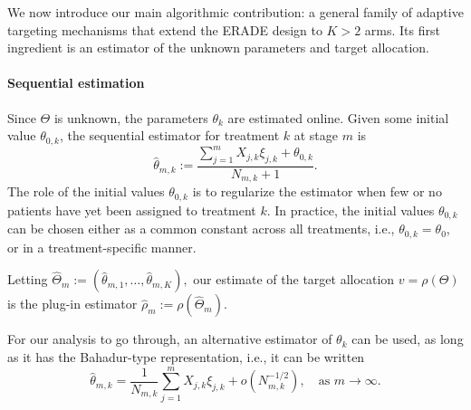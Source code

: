 We now introduce our main algorithmic contribution: a general family of adaptive targeting mechanisms that extend the ERADE design to $K> 2$ arms. Its first ingredient is an estimator of the unknown parameters and target allocation.

\paragraph*{Sequential estimation} 
Since $\Theta$ is unknown, the parameters $\theta_k$ are estimated online. Given some initial value $\theta_{0,k}$, the sequential estimator for treatment $k$ at stage $m$ is
\begin{equation}\label{eq:dbcd-estimator}
	\hat{\theta}_{m,k} := \frac{\sum_{j=1}^m X_{j,k}\xi_{j,k} + \theta_{0,k}}{N_{m,k}+1}.
\end{equation}
The role of the initial values $\theta_{0,k}$ is to regularize the estimator when few or no patients have yet been assigned to treatment $k$. In practice, the initial values $\theta_{0,k}$ can be chosen either as a common constant across all treatments, i.e., $\theta_{0,k} = \theta_0$, or in a treatment-specific manner.

Letting \(\hat{\Theta}_m := (\hat{\theta}_{m,1}, \ldots, \hat{\theta}_{m,K}),\) our estimate of the target allocation $v=\rho(\Theta)$ is the plug-in estimator $\hat{\rho}_m := \rho(\hat{\Theta}_m).$


\begin{remark}
For our analysis to go through, an alternative estimator of $\theta_k$ can be used, as long as it has the Bahadur-type representation, i.e., it can be written
\begin{equation}\label{eq:bahadur-estimator}
	\hat{\theta}_{m,k} = \frac{1}{N_{m,k}}\sum_{j=1}^{m}X_{j,k}\xi_{j,k} + o(N_{m,k}^{-1/2}),\quad \text{as } m\to\infty.
\end{equation}
\end{remark}


